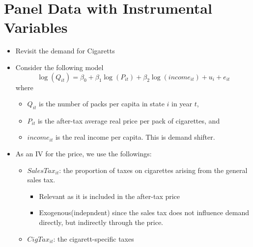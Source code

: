 \documentclass[]{book}
\providecommand{\tightlist}{%
  \setlength{\itemsep}{0pt}\setlength{\parskip}{0pt}}
\begin{document}
\section{Panel Data with Instrumental
Variables}\label{panel-data-with-instrumental-variables}

\begin{itemize}
\tightlist
\item
  Revisit the demand for Cigaretts
\item
  Consider the following model \[
  \log (Q_{it}) = \beta_0 + \beta_1 \log (P_{it}) + \beta_2 \log(income_{it}) + u_i + e_{it}
  \] where

  \begin{itemize}
  \tightlist
  \item
    \(Q_{it}\) is the number of packs per capita in state \(i\) in year
    \(t\),
  \item
    \(P_{it}\) is the after-tax average real price per pack of
    cigarettes, and
  \item
    \(income_{it}\) is the real income per capita. This is demand
    shifter.
  \end{itemize}
\item
  As an IV for the price, we use the followings:

  \begin{itemize}
  \tightlist
  \item
    \(SalesTax_{it}\): the proportion of taxes on cigarettes arising
    from the general sales tax.

    \begin{itemize}
    \tightlist
    \item
      Relevant as it is included in the after-tax price
    \item
      Exogenous(indepndent) since the sales tax does not influence
      demand directly, but indirectly through the price.
    \end{itemize}
  \item
    \(CigTax_{it}\): the cigarett-specific taxes
  \end{itemize}
\end{itemize}
\end{document}
